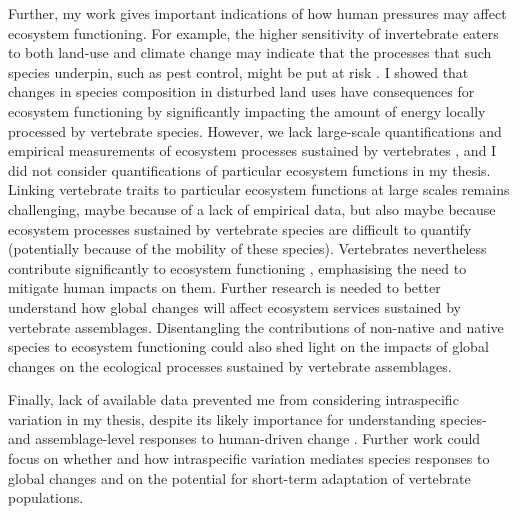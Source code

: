 Further, my work gives important indications of how human pressures may affect ecosystem functioning. For example, the higher sensitivity of invertebrate eaters to both land-use and climate change may indicate that the processes that such species underpin, such as pest control, might be put at risk \citep{Civantos2012}. I showed that changes in species composition in disturbed land uses have consequences for ecosystem functioning by significantly impacting the amount of energy locally processed by vertebrate species. However, we lack large-scale quantifications and empirical measurements of ecosystem processes sustained by vertebrates \citep{Wenny2011, Luck2012}, and I did not consider quantifications of particular ecosystem functions in my thesis. Linking vertebrate traits to particular ecosystem functions at large scales remains challenging, maybe because of a lack of empirical data, but also maybe because ecosystem processes sustained by vertebrate species are difficult to quantify (potentially because of the mobility of these species). Vertebrates nevertheless contribute significantly to ecosystem functioning \citep{Wandrag2015, Breviglieri2017, Ratto2018, Zhang2018_trophicinter}, emphasising the need to mitigate human impacts on them. Further research is needed to better understand how global changes will affect ecosystem services sustained by vertebrate assemblages. Disentangling the contributions of non-native and native species to ecosystem functioning could also shed light on the impacts of global changes on the ecological processes sustained by vertebrate assemblages.

Finally, lack of available data prevented me from considering intraspecific variation in my thesis, despite its likely importance for understanding species- and assemblage-level responses to human-driven change \citep{Carlson2014, Guralnick2016, Rohr2018}. Further work could focus on whether and how intraspecific variation mediates species responses to global changes and on the potential for short-term adaptation of vertebrate populations.

